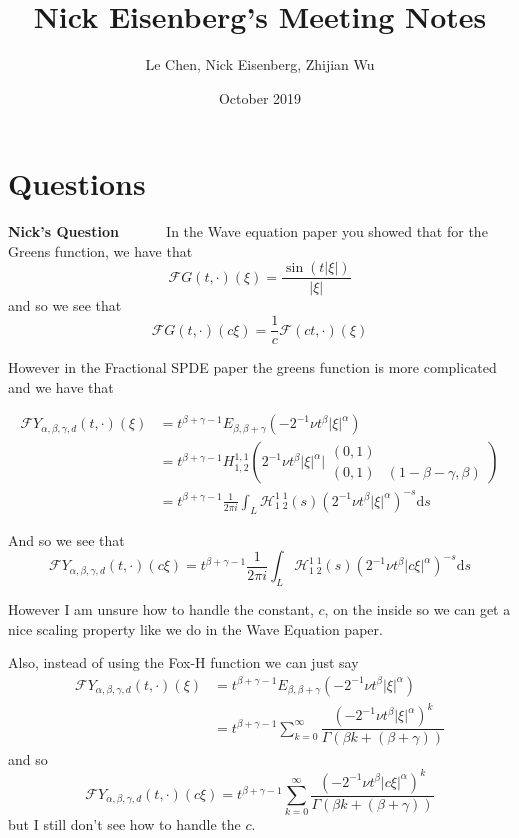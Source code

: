 \documentclass[a4paper,11pt]{article}
\title{Nick Eisenberg's Meeting Notes}
\author{Le Chen, Nick Eisenberg, Zhijian Wu}
\date{October 2019}
\numberwithin{equation}{section}
\theoremstyle{plain}
\theoremstyle{definition}
\newcommand{\ud}{\ensuremath{\mathrm{d} }}
\newcounter{NQ}
\newenvironment{NickQuestion}[1][] %
{\refstepcounter{NQ}
	\begin{mdframed}[backgroundcolor=lightgray]\textbf{Nick's Question \theNQ \: #1~~}~~~\noindent}%
	{\end{mdframed}}
\numberwithin{NQ}{section}
\numberwithin{LQ}{section}
\numberwithin{ZQ}{section}
\begin{document}
	\section{Questions}
	\begin{NickQuestion}
		In the Wave equation paper you showed that for the Greens function, we have that
		\[
		\mathcal{F}G(t,\cdot)(\xi)=\frac{\sin(t |\xi|)}{|\xi|}
		\]
		and so we see that
		\[
		\mathcal{F}G(t,\cdot)(c\xi) = \frac{1}{c}\mathcal{F}(ct, \cdot)(\xi)
		\]

		However in the Fractional SPDE paper the greens function is more complicated and we have that

		\begin{align*}
		\mathcal{F}Y_{\alpha, \beta, \gamma, d}(t, \cdot)(\xi) &= t^{\beta + \gamma -1} E_{\beta, \beta + \gamma}(-2^{-1}\nu t^\beta |\xi|^\alpha)
		\\&= t^{\beta + \gamma -1} H^{1,1}_{1,2}\left(2^{-1}\nu t^\beta |\xi|^\alpha \bigg\vert \begin{matrix} (0,1) &
		\\ (0,1) & (1- \beta - \gamma ,\beta) \end{matrix} \right)
		\\&= t^{\beta + \gamma -1} \frac{1}{2 \pi i} \int_L \mathcal{H}^{1\;1}_{1\;2}(s) \left(2^{-1}\nu t^\beta |\xi|^\alpha\right)^{-s} \ud s
		\end{align*}

		And so we see that
		\[
		\mathcal{F}Y_{\alpha, \beta, \gamma, d}(t, \cdot)(c\xi) =	t^{\beta + \gamma -1} \frac{1}{2 \pi i} \int_L \mathcal{H}^{1\;1}_{1\;2}(s) \left(2^{-1}\nu t^\beta |c\xi|^\alpha\right)^{-s} \ud s
		\]

		However I am unsure how to handle the constant, $c$, on the inside so we can get a nice scaling property like we do in the Wave Equation paper.

		Also, instead of using the Fox-H function we can just say
		\begin{align*}
		\mathcal{F}Y_{\alpha, \beta, \gamma, d}(t, \cdot)(\xi) &= t^{\beta + \gamma -1} E_{\beta, \beta + \gamma}(-2^{-1}\nu t^\beta |\xi|^\alpha)
		\\&= t^{\beta + \gamma -1} \sum_{k=0}^\infty \dfrac{\left(-2^{-1}\nu t^\beta |\xi|^\alpha\right)^k}{\Gamma\left(\beta k + (\beta + \gamma)\right)}
		\end{align*}
		and so
		\[
		\mathcal{F}Y_{\alpha, \beta, \gamma, d}(t, \cdot)(c\xi) = t^{\beta + \gamma -1} \sum_{k=0}^\infty \dfrac{\left(-2^{-1}\nu t^\beta |c\xi|^\alpha\right)^k}{\Gamma\left(\beta k + (\beta + \gamma)\right)}
		\]
		but I still don't see how to handle the $c$.
	\end{NickQuestion}
\end{document}
